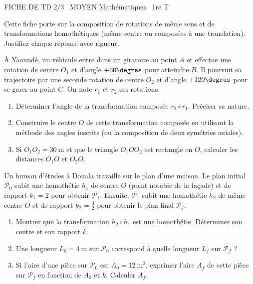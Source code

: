 \documentclass[11pt]{article}
\begin{document}
\begin{tcolorbox}[enhanced,colback=popink,colframe=popink,arc=10pt,boxrule=0pt,left=12pt,right=12pt,top=9pt,bottom=9pt]
{\color{white}\popxbold\small FICHE DE TD 2/3 \textbullet\ MOYEN \hfill Mathématiques \textbullet\ 1re T\par}
\end{tcolorbox}
\vspace{4pt}
Cette fiche porte sur la composition de rotations de même sens et de transformations homothétiques (même centre ou composées à une translation). Justifiez chaque réponse avec rigueur.

\begin{exercice}
À Yaoundé, un véhicule entre dans un giratoire au point $A$ et effectue une rotation de centre $O_1$ et d'angle $+60\degres$ pour atteindre $B$. Il poursuit sa trajectoire par une seconde rotation de centre $O_2$ et d'angle $+120\degres$ pour se garer au point $C$. On note $r_1$ et $r_2$ ces rotations.
\begin{enumerate}
    \item Déterminer l'angle de la transformation composée $r_2 \circ r_1$. Préciser sa nature.
    \item Construire le centre $O$ de cette transformation composée en utilisant la méthode des angles inscrits (ou la composition de deux symétries axiales).
    \item Si $O_1O_2 = \SI{30}{\meter}$ et que le triangle $O_1OO_2$ est rectangle en $O$, calculer les distances $O_1O$ et $O_2O$.
\end{enumerate}
\end{exercice}

\begin{exercice}
Un bureau d'études à Douala travaille sur le plan d'une maison. Le plan initial $\mathcal{P}_0$ subit une homothétie $h_1$ de centre $O$ (point notable de la façade) et de rapport $k_1 = 2$ pour obtenir $\mathcal{P}_1$. Ensuite, $\mathcal{P}_1$ subit une homothétie $h_2$ de même centre $O$ et de rapport $k_2 = \frac{3}{2}$ pour obtenir le plan final $\mathcal{P}_f$.
\begin{enumerate}
    \item Montrer que la transformation $h_2 \circ h_1$ est une homothétie. Déterminer son centre et son rapport $k$.
    \item Une longueur $L_0 = \SI{4}{\meter}$ sur $\mathcal{P}_0$ correspond à quelle longueur $L_f$ sur $\mathcal{P}_f$ ?
    \item Si l'aire d'une pièce sur $\mathcal{P}_0$ est $A_0 = \SI{12}{\square\meter}$, exprimer l'aire $A_f$ de cette pièce sur $\mathcal{P}_f$ en fonction de $A_0$ et $k$. Calculer $A_f$.
\end{enumerate}
\end{exercice}
\end{document}
